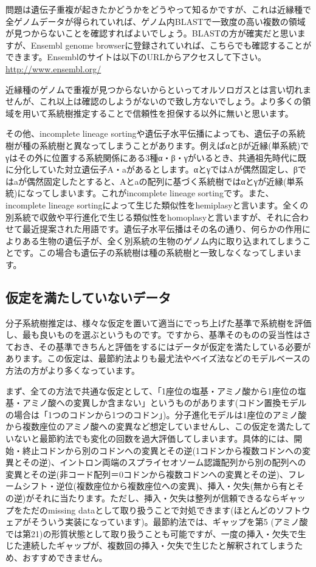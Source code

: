 \documentclass[titlepage,10pt,a4paper]{jsbook}
\begin{document}
問題は遺伝子重複が起きたかどうかをどうやって知るかですが、これは近縁種で全ゲノムデータが得られていれば、ゲノム内BLASTで一致度の高い複数の領域が見つからないことを確認すればよいでしょう。BLASTの方が確実だと思いますが、Ensembl genome browserに登録されていれば、こちらでも確認することができます。Ensemblのサイトは以下のURLからアクセスして下さい。\\
\href{http://www.ensembl.org/}{http://www.ensembl.org/}

近縁種のゲノムで重複が見つからないからといってオルソロガスとは言い切れませんが、これ以上は確認のしようがないので致し方ないでしょう。より多くの領域を用いて系統樹推定することで信頼性を担保する以外に無いと思います。

その他、incomplete lineage sortingや遺伝子水平伝播によっても、遺伝子の系統樹が種の系統樹と異なってしまうことがあります。例えばαとβが近縁(単系統)でγはその外に位置する系統関係にある3種α・β・γがいるとき、共通祖先時代に既に分化していた対立遺伝子A・aがあるとします。αとγではAが偶然固定し、βではaが偶然固定したとすると、Aとaの配列に基づく系統樹ではαとγが近縁(単系統)になってしまいます。これがincomplete lineage sortingです。また、incomplete lineage sortingによって生じた類似性をhemiplasyと言います\citep{Avise2008}。全くの別系統で収斂や平行進化で生じる類似性をhomoplasyと言いますが、それに合わせて最近提案された用語です。遺伝子水平伝播はその名の通り、何らかの作用によりある生物の遺伝子が、全く別系統の生物のゲノム内に取り込まれてしまうことです。この場合も遺伝子の系統樹は種の系統樹と一致しなくなってしまいます。

\subsection{仮定を満たしていないデータ}

分子系統樹推定は、様々な仮定を置いて適当にでっち上げた基準で系統樹を評価し、最も良いものを選ぶというものです。ですから、基準そのものの妥当性はさておき、その基準できちんと評価をするにはデータが仮定を満たしている必要があります。この仮定は、最節約法よりも最尤法やベイズ法などのモデルベースの方法の方がより多くなっています。

まず、全ての方法で共通な仮定として、「1座位の塩基・アミノ酸から1座位の塩基・アミノ酸への変異しか含まない」というものがあります(コドン置換モデルの場合は「1つのコドンから1つのコドン」)。分子進化モデルは1座位のアミノ酸から複数座位のアミノ酸への変異など想定していませんし、この仮定を満たしていないと最節約法でも変化の回数を過大評価してしまいます。具体的には、開始・終止コドンから別のコドンへの変異とその逆(1コドンから複数コドンへの変異とその逆)、イントロン両端のスプライセオソーム認識配列から別の配列への変異とその逆(非コード配列＝0コドンから複数コドンへの変異とその逆)、フレームシフト・逆位(複数座位から複数座位への変異)、挿入・欠失(無から有とその逆)がそれに当たります。ただし、挿入・欠失は整列が信頼できるならギャップをただのmissing dataとして取り扱うことで対処できます(ほとんどのソフトウェアがそういう実装になっています)。最節約法では、ギャップを第5 (アミノ酸では第21)の形質状態として取り扱うことも可能ですが、一度の挿入・欠失で生じた連続したギャップが、複数回の挿入・欠失で生じたと解釈されてしまうため、おすすめできません。
\end{document}
